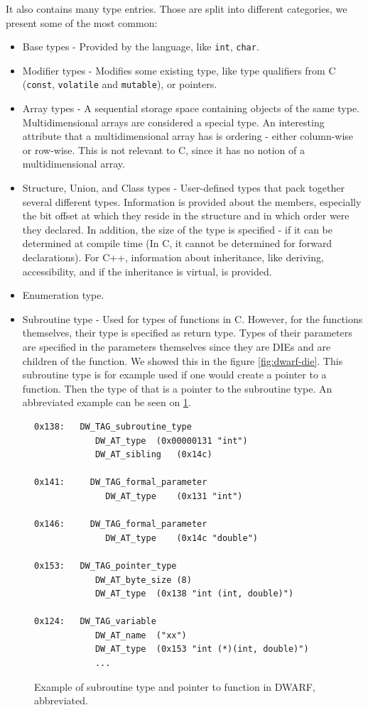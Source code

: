 It also contains many type entries.
Those are split into different categories, we present some of the most common:
\begin{itemize}
    \item Base types - Provided by the language, like \texttt{int},
        \texttt{char}.
    \item Modifier types - Modifies some existing type, like type qualifiers
        from C (\texttt{const}, \texttt{volatile} and \texttt{mutable}), or
        pointers.
    \item Array types - A sequential storage space containing objects of the
        same type. Multidimensional arrays are considered a special type.
        An interesting attribute that a multidimensional array has is ordering -
        either column-wise or row-wise. This is not relevant to C, since it has no
        notion of a multidimensional array.
    \item Structure, Union, and Class types - User-defined types that pack
        together several different types. Information is provided about the
        members, especially the bit offset at which they reside in the structure
        and in which order were they declared. In addition, the size of the type
        is specified - if it can be determined at compile time (In C, it cannot
        be determined for forward declarations). For C++, information about
        inheritance, like deriving, accessibility, and if the inheritance is
        virtual, is provided.
    \item Enumeration type.
    \item Subroutine type - Used for types of functions in C. However, for the
        functions themselves, their type is specified as return type. Types of
        their parameters are specified in the parameters themselves since they
        are DIEs and are children of the function. We showed this in the figure
        \ref{fig:dwarf-die}. This subroutine type is for example used if one
        would create a pointer to a function. Then the type of that is a pointer
        to the subroutine type. An abbreviated example can be seen on
        \ref{fig:dwarf-ptr-to-fun}.
\end{itemize}

\begin{figure}
    \begin{lstlisting}
0x138:   DW_TAG_subroutine_type
            DW_AT_type	(0x00000131 "int")
            DW_AT_sibling	(0x14c)

0x141:     DW_TAG_formal_parameter
              DW_AT_type	(0x131 "int")

0x146:     DW_TAG_formal_parameter
              DW_AT_type	(0x14c "double")

0x153:   DW_TAG_pointer_type
            DW_AT_byte_size	(8)
            DW_AT_type	(0x138 "int (int, double)")

0x124:   DW_TAG_variable
            DW_AT_name	("xx")
            DW_AT_type	(0x153 "int (*)(int, double)")
            ...
    \end{lstlisting}
    \caption{Example of subroutine type and pointer to function in DWARF, abbreviated.}
    \label{fig:dwarf-ptr-to-fun}
\end{figure}

